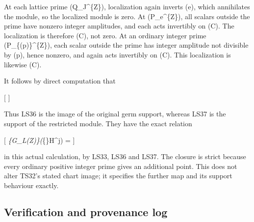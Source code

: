 \documentclass[
]{article}
\begin{document}
At each lattice prime (Q\_J\^{}\{\mathbb Z\}), localization again
inverts (e), which annihilates the module, so the localized module is
zero. At (P\_e\^{}\{\mathbb Z\}), all scalars outside the prime have
nonzero integer amplitudes, and each acts invertibly on (\mathbb C). The
localization is therefore (\mathbb C), not zero. At an ordinary integer
prime (P\_\{(p)\}\^{}\{\mathbb Z\}), each scalar outside the prime has
integer amplitude not divisible by (p), hence nonzero, and again acts
invertibly on (\mathbb C). This localization is likewise (\mathbb C).

It follows by direct computation that

{[}   {]}

Thus LS36 is the image of the original germ support, whereas LS37 is the
support of the restricted module. They have the exact relation

{[}
\emph{\{G\_L(\mathbb Z)\}(}\{\varphi\}H\^{}j)
= {]}

in this actual calculation, by LS33, LS36 and LS37. The closure is
strict because every ordinary positive integer prime gives an additional
point. This does not alter TS32's stated chart image; it specifies the
further map and its support behaviour exactly.

\subsection{Verification and provenance
log}\label{verification-and-provenance-log}
\end{document}
